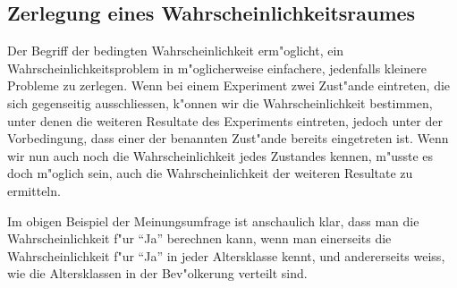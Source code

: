 \subsection{Zerlegung eines Wahrscheinlichkeitsraumes}
Der
Begriff der bedingten Wahrscheinlichkeit erm"oglicht,
ein Wahrscheinlichkeitsproblem in m"oglicherweise einfachere, jedenfalls
kleinere Probleme zu zerlegen.
Wenn bei einem Experiment zwei Zust"ande
eintreten, die sich gegenseitig ausschliessen, k"onnen wir die 
Wahrscheinlichkeit bestimmen, unter denen die weiteren Resultate
des Experiments eintreten, jedoch unter der Vorbedingung, dass einer
der benannten Zust"ande bereits eingetreten ist.
Wenn wir nun auch
noch die Wahrscheinlichkeit jedes Zustandes kennen, m"usste es doch
m"oglich sein, auch die Wahrscheinlichkeit der weiteren Resultate zu
ermitteln.

Im obigen Beispiel der Meinungsumfrage ist anschaulich klar, dass man die
Wahrscheinlichkeit f"ur ``Ja'' berechnen kann, wenn man einerseits die
Wahrscheinlichkeit f"ur ``Ja'' in  jeder Altersklasse kennt, und andererseits
weiss, wie die Altersklassen in der Bev"olkerung verteilt sind.

